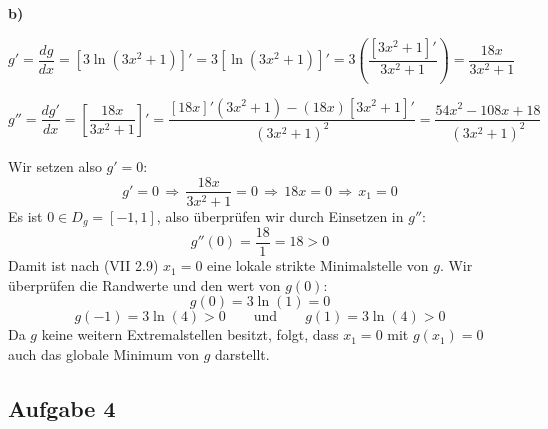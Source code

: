 \documentclass[a4paper,graphics,11pt]{article}
\newcommand{\aufgabe}[1]{\subsection*{Aufgabe #1}}
\begin{document}
\newpage

\textbf{b)}

$$
    g' = \frac{dg}{dx} = [3\ln(3x^2+1)]'
    = 3[\ln(3x^2+1)]'
    = 3\left(\frac{[3x^2+1]'}{3x^2+1}\right)
    = \frac{18x}{3x^2+1}
$$

$$
    g'' = \frac{dg'}{dx} = \left[\frac{18x}{3x^2+1}\right]'
    = \frac{[18x]'(3x^2+1)-(18x)[3x^2+1]'}{(3x^2+1)^2}
    = \frac{54x^2-108x+18}{(3x^2+1)^2}
$$

Wir setzen also $g' = 0$:
$$
    g' = 0 \,\Longrightarrow\, \frac{18x}{3x^2+1} = 0
    \,\Longrightarrow\, 18x = 0 \,\Longrightarrow\, x_1 = 0
$$
Es ist $0 \in D_g = [-1, 1]$, also überprüfen wir durch Einsetzen in $g''$:
$$
    g''(0) = \frac{18}{1} = 18 > 0
$$
Damit ist nach (VII 2.9) $x_1=0$ eine lokale strikte Minimalstelle von $g$.
Wir überprüfen die Randwerte und den wert von $g(0)$:
$$
    g(0) = 3\ln(1) = 0
$$$$
    g(-1) = 3\ln(4) > 0 \qquad\text{und}\qquad g(1) = 3\ln(4) >0
$$
Da $g$ keine weitern Extremalstellen besitzt, folgt, dass $x_1=0$ mit $g(x_1) = 0$ auch das
globale Minimum von $g$ darstellt.

\aufgabe{4}
\end{document}
